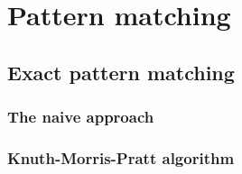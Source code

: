 \documentclass[../main.tex]{subfiles}
\begin{document}
\section{Pattern matching}

\subsection{Exact pattern matching}

\subsubsection{The naive approach}

\subsubsection{Knuth-Morris-Pratt algorithm}
\end{document}
